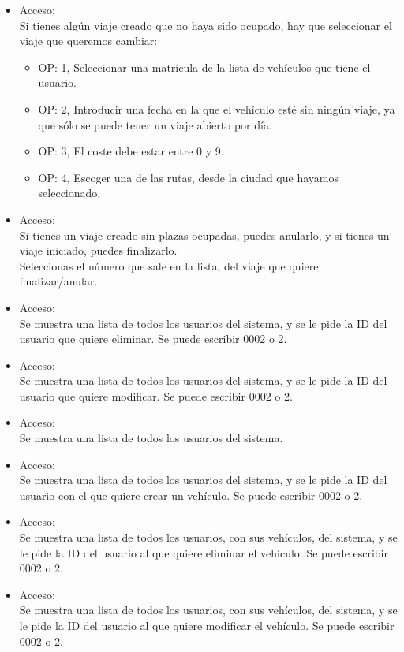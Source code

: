 \begin{itemize}
  \item Acceso:\\
  Si tienes algún viaje creado que no haya sido ocupado, hay que seleccionar el viaje que queremos cambiar:
  \begin{itemize}
    \item OP: 1, Seleccionar una matrícula de la lista de vehículos que tiene el usuario. 
    \item OP: 2, Introducir una fecha en la que el vehículo esté sin ningún viaje, ya que sólo se puede tener un viaje abierto por día. 
    \item OP: 3, El coste debe estar entre 0 y 9.
    \item OP: 4, Escoger una de las rutas, desde la ciudad que hayamos seleccionado.
  \end{itemize}
  \item Acceso:\\
  Si tienes un viaje creado sin plazas ocupadas, puedes anularlo, y si tienes un viaje iniciado, puedes finalizarlo.\\
  Seleccionas el número que sale en la lista, del viaje que quiere finalizar/anular.

  \item Acceso:\\
  Se muestra una lista de todos los usuarios del sistema, y se le pide la ID del usuario que quiere eliminar. Se puede escribir 0002 o 2.

  \item Acceso:\\
  Se muestra una lista de todos los usuarios del sistema, y se le pide la ID del usuario que quiere modificar. Se puede escribir 0002 o 2.

  \item Acceso:\\
  Se muestra una lista de todos los usuarios del sistema.

  \item Acceso:\\
  Se muestra una lista de todos los usuarios del sistema, y se le pide la ID del usuario con el que quiere crear un vehículo. Se puede escribir 0002 o 2.

  \item Acceso:\\
  Se muestra una lista de todos los usuarios, con sus vehículos, del sistema, y se le pide la ID del usuario al que quiere eliminar el vehículo. Se puede escribir 0002 o 2.

  \item Acceso:\\
  Se muestra una lista de todos los usuarios, con sus vehículos, del sistema, y se le pide la ID del usuario al que quiere modificar el vehículo. Se puede escribir 0002 o 2.


\end{itemize}
